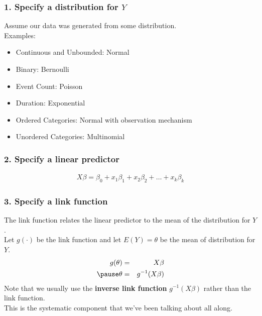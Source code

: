 \documentclass{beamer}
\begin{document}
\begin{frame}
\frametitle{1. Specify a distribution for $Y$}
\pause
Assume our data was generated from some distribution.\\
\pause
\bigskip
Examples:
\pause
\begin{itemize}
\item Continuous and Unbounded: \pause Normal
\pause
\item Binary: \pause Bernoulli 
\pause
\item Event Count: \pause Poisson
\pause
\item Duration: \pause Exponential
\pause
\item Ordered Categories: \pause Normal with observation mechanism
\pause
\item Unordered Categories: \pause Multinomial
\end{itemize}
\end{frame}

\begin{frame}
\frametitle{2. Specify a linear predictor}
\pause
\begin{eqnarray*}
X \beta = \beta_0 + x_1 \beta_1 + x_2 \beta_2 + \dots + x_k \beta_k
\end{eqnarray*}
\end{frame}

\begin{frame}
\frametitle{3. Specify a link function}
\pause
The link function relates the linear predictor to the mean of the
distribution for $Y$. \\
\bigskip
\pause
Let $g(\cdot)$ be the link function and let $E(Y) = \theta$ be the
mean of distribution for $Y$.  
\pause
\begin{eqnarray*}
g(\theta) &=& X\beta \\
\pause
\theta &=& g^{-1} (X \beta)
\end{eqnarray*}
\pause
Note that we usually use the \textbf{inverse link function} $g^{-1}(X
\beta)$ rather than the link function. \\
\pause
\bigskip
This is the systematic component that we've been talking about all along.
\end{frame}
\end{document}
